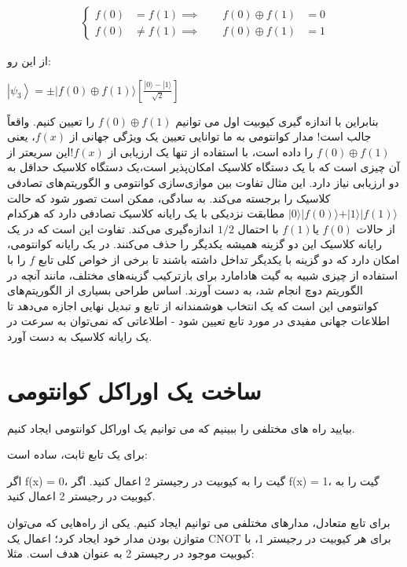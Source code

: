 \documentclass{book}
\begin{document}
$$
\begin{aligned}
	\left\{
	\begin{aligned}
		f(0) &= f(1) 
		\implies \qquad f(0) \oplus f(1) &= 0\\
		f(0) &\neq f(1) 
		\implies \qquad f(0) \oplus f(1) &= 1
	\end{aligned}
	\right.
\end{aligned}$$

از این رو:

\begin{center}
	$\left|\psi_3\right\rangle= \pm|f(0) \oplus f(1)\rangle\left[\frac{|0\rangle-|1\rangle}{\sqrt{2}}\right]$
\end{center}
بنابراین با اندازه گیری کیوبیت اول می توانیم $f(0) \oplus f(1)$ را تعیین کنیم. واقعاً جالب است! مدار کوانتومی به ما توانایی تعیین یک ویژگی جهانی از $f(x)$، یعنی$ f(0)\oplus f(1)$ را داده است، با استفاده از تنها یک ارزیابی از $f(x)$!این سریعتر از آن چیزی است که با یک دستگاه کلاسیک امکان‌پذیر است،یک دستگاه کلاسیک حداقل به دو ارزیابی نیاز دارد.
این مثال تفاوت بین موازی‌سازی کوانتومی و الگوریتم‌های تصادفی کلاسیک را برجسته می‌کند. به سادگی، ممکن است تصور شود که حالت $\vert0\rangle \vert f(0) \rangle + \vert1\rangle \vert f(1) \rangle$ مطابقت نزدیکی با یک رایانه کلاسیک تصادفی دارد که هرکدام از حالات $ f (0)$ یا$ f (1) $ با احتمال $1/2$ اندازه‌گیری می‌کند.
تفاوت این است که در یک رایانه کلاسیک این دو گزینه همیشه یکدیگر را حذف می‌کنند. در یک رایانه کوانتومی، امکان دارد که دو گزینه با یکدیگر تداخل داشته باشند تا برخی از خواص کلی تابع $f$ را با استفاده از چیزی شبیه به گیت هادامارد برای بازترکیب گزینه‌های مختلف، مانند آنچه در الگوریتم دوچ انجام شد، به دست آورند.
اساس طراحی بسیاری از الگوریتم‌های کوانتومی این است که یک انتخاب هوشمندانه از تابع و تبدیل نهایی اجازه می‌دهد تا اطلاعات جهانی مفیدی در مورد تابع تعیین شود - اطلاعاتی که نمی‌توان به سرعت در یک رایانه کلاسیک به دست آورد.


	
\section{ساخت یک اوراکل کوانتومی}
بیایید راه های مختلفی را ببینیم که می توانیم یک اوراکل کوانتومی ایجاد کنیم.

برای یک تابع ثابت، ساده است:

اگر f(x) = 0، گیت را به کیوبیت در رجیستر 2 اعمال کنید.
اگر f(x) = 1، گیت را به کیوبیت در رجیستر 2 اعمال کنید.

برای تابع متعادل، مدارهای مختلفی می توانیم ایجاد کنیم. یکی از راه‌هایی که می‌توان متوازن بودن مدار خود ایجاد کرد؛ اعمال یک CNOT برای هر کیوبیت در رجیستر 1، با کیوبیت موجود در رجیستر 2 به عنوان هدف است. مثلا:
\end{document}
